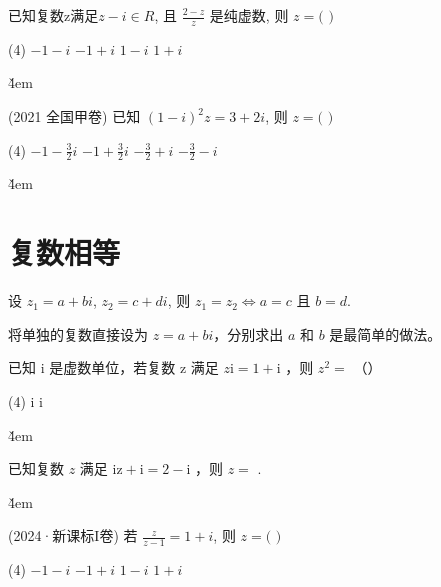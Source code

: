 \begin{example}
    已知复数z满足$z-i\in R$, 且 $\frac{2-z}{z}$ 是纯虚数, 则 $z=($ \quad $)$
    \begin{tasks}(4)
        \task $-1-i$
        \task $-1+i$
        \task $1-i$
        \task $1+i$
    \end{tasks}
\end{example}

\v{4em}

\begin{example}(2021 全国甲卷)
    已知 $(1-i)^{2}z=3+2i$, 则 $z=($ \quad $)$
    \begin{tasks}(4)
        \task $-1-\frac{3}{2}i$
        \task $-1+\frac{3}{2}i$
        \task $-\frac{3}{2}+i$
        \task $-\frac{3}{2}-i$
    \end{tasks}
\end{example}

\v{4em}

\section{复数相等}

\begin{definition}[复数相等]
    设 $z_{1}=a+bi$, $z_{2}=c+di$, 则 $z_{1}=z_{2}\Leftrightarrow a=c$ 且 $b=d$.
\end{definition}

\begin{theorem}[分离法求 $z$]
    将单独的复数直接设为 $z = a + bi$，分别求出 $a$ 和 $b$ 是最简单的做法。
\end{theorem}

\begin{example}
    已知 i 是虚数单位，若复数 z 满足 $z \mathrm{i}=1+\mathrm{i}$ ，则 $z^2=$ （\qquad）
    \begin{tasks}(4)
         i
         i
    \end{tasks}
\end{example}

\v{4em}

\begin{example}
    已知复数 $z$ 满足 $\mathrm{iz}+\mathrm{i}=2-\mathrm{i}$ ，则 $z=$ \underline{\qquad}.
\end{example}

\v{4em}

\begin{example}(2024·新课标I卷)
    若 $\frac{z}{z-1}=1+i$, 则 $z=($ \quad $)$
    \begin{tasks}(4)
        \task $-1-i$
        \task $-1+i$
        \task $1-i$
        \task $1+i$
    \end{tasks}
\end{example}

